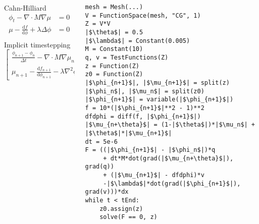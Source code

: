 \documentclass[presentation]{beamer}
\begin{document}
\begin{frame}[fragile]
  \begin{columns}
    \begin{column}{0.5\textwidth}
      \begin{block}{Cahn-Hilliard}
        \small
        \begin{align*}
          \phi_t - \nabla \cdot M \nabla \mu &= 0\\
          \mu - \frac{\text{d} f}{\text{d} \phi} + \lambda \Delta \phi &= 0\\
        \end{align*}
        Implicit timestepping
        \begin{equation*}
          \begin{bmatrix}
            \frac{\phi_{n+1} - \phi_n}{\Delta t} - \nabla \cdot M \nabla \mu_{n+\theta}\\
            \mu_{n+1} - \frac{\text{d} f_{n+1}}{\text{d} \phi_{n+1}} -
            \lambda \nabla^2\phi_{n+1}
          \end{bmatrix} = 0
        \end{equation*}
      \end{block}
    \end{column}
    \begin{column}{0.5\textwidth}
\begin{verbatim}
mesh = Mesh(...)
V = FunctionSpace(mesh, "CG", 1)
Z = V*V
|$\theta$| = 0.5
|$\lambda$| = Constant(0.005)
M = Constant(10)
q, v = TestFunctions(Z)
z = Function(Z)
z0 = Function(Z)
|$\phi_{n+1}$|, |$\mu_{n+1}$| = split(z)
|$\phi_n$|, |$\mu_n$| = split(z0)
|$\phi_{n+1}$| = variable(|$\phi_{n+1}$|)
f = 10*(|$\phi_{n+1}$|**2 - 1)**2
dfdphi = diff(f, |$\phi_{n+1}$|)
|$\mu_{n+\theta}$| = (1-|$\theta$|)*|$\mu_n$| + |$\theta$|*|$\mu_{n+1}$|
dt = 5e-6
F = ((|$\phi_{n+1}$| - |$\phi_n$|)*q 
     + dt*M*dot(grad(|$\mu_{n+\theta}$|), grad(q)) 
     + (|$\mu_{n+1}$| - dfdphi)*v
     -|$\lambda$|*dot(grad(|$\phi_{n+1}$|), grad(v)))*dx
while t < tEnd:
    z0.assign(z)
    solve(F == 0, z)
\end{verbatim}
    \end{column}
  \end{columns}
\end{frame}
\end{document}
